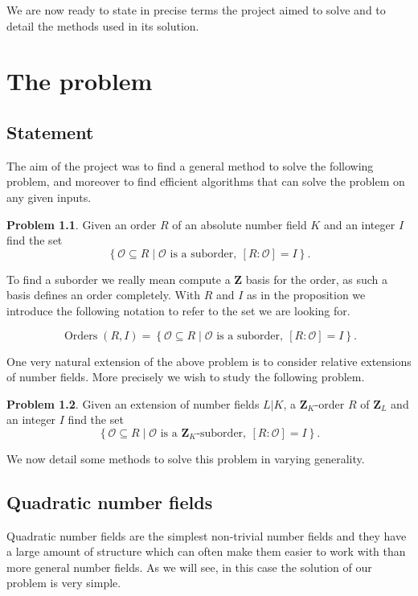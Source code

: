 \documentclass[a4paper,abstracton,bibtotoc]{scrreprt}
\theoremstyle{definition}
\newtheorem{prob}{Problem}
\newcommand{\ZZ}{\mathbf{Z}}
\renewcommand{\O}{\mathcal{O}}
\DeclareMathOperator{\Orders}{Orders}
\begin{document}
\minisec{}
We are now ready to state in precise terms the project aimed to solve and to detail the methods used in its solution.

\chapter{The problem}
\label{chap:prob}
\section{Statement}
\label{sec:statements}

The aim of the project was to find a general method to solve the following problem, and moreover to find efficient algorithms that can solve the problem on any given inputs.

\begin{prob}
Given an order $R$ of an absolute number field $K$ and an integer $I$ find the set
\[\left\{ \O\subseteq R \mid \O\text{ is a suborder},\ [R:\O] = I\right\}.\]
\end{prob}

To find a suborder we really mean compute a $\ZZ$ basis for the order, as such a basis defines an order completely.
With $R$ and $I$ as in the proposition we introduce the following notation to refer to the set we are looking for.

\[\Orders(R,I) = \left\{ \O\subseteq R \mid \O\text{ is a suborder},\ [R:\O] = I\right\}.\]

\minisec{}
One very natural extension of the above problem is to consider relative extensions of number fields.
More precisely we wish to study the following problem.

\begin{prob} %
Given an extension of number fields $L|K$, a $\ZZ_K$-order $R$ of $\ZZ_L$ and an integer $I$ find the set
\[\left\{ \O\subseteq R \mid \O\text{ is a $\ZZ_K$-suborder},\ [R:\O] = I\right\}.\]
\end{prob}

We now detail some methods to solve this problem in varying generality.

\section{Quadratic number fields}

Quadratic number fields are the simplest non-trivial number fields and they have a large amount of structure which can often make them easier to work with than more general number fields.
As we will see, in this case the solution of our problem is very simple.
\end{document}
